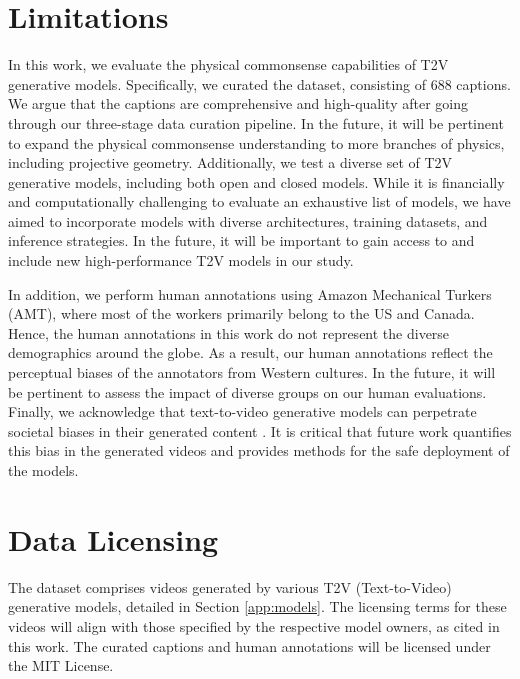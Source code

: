 \newpage




\section{Limitations}
\label{sec:limitations}



In this work, we evaluate the physical commonsense capabilities of T2V generative models. Specifically, we curated the \name{} dataset, consisting of 688 captions. We argue that the captions are comprehensive and high-quality after going through our three-stage data curation pipeline. In the future, it will be pertinent to expand the physical commonsense understanding to more branches of physics, including projective geometry. Additionally, we test a diverse set of T2V generative models, including both open and closed models. While it is financially and computationally challenging to evaluate an exhaustive list of models, we have aimed to incorporate models with diverse architectures, training datasets, and inference strategies. In the future, it will be important to gain access to and include new high-performance T2V models in our study.

In addition, we perform human annotations using Amazon Mechanical Turkers (AMT), where most of the workers primarily belong to the US and Canada. Hence, the human annotations in this work do not represent the diverse demographics around the globe. As a result, our human annotations reflect the perceptual biases of the annotators from Western cultures. In the future, it will be pertinent to assess the impact of diverse groups on our human evaluations. Finally, we acknowledge that text-to-video generative models can perpetrate societal biases in their generated content \cite{wan2024survey, bansal2022well}. It is critical that future work quantifies this bias in the generated videos and provides methods for the safe deployment of the models.


\section{Data Licensing}
\label{sec:data_license}

The \name{} dataset comprises videos generated by various T2V (Text-to-Video) generative models, detailed in Section \ref{app:models}. The licensing terms for these videos will align with those specified by the respective model owners, as cited in this work. The curated captions and human annotations will be licensed under the MIT License.

